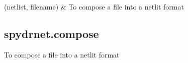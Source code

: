\documentclass[letterpaper,10pt,english,openany,oneside]{sphinxmanual}
\begin{document}
\begin{savenotes}\sphinxatlongtablestart\begin{longtable}[c]{}
\hline

\endfirsthead

%
{}\\
\hline

\endhead

\hline
{}\\
\endfoot

\endlastfoot

{\hyperref[\detokenize{reference/classes/generated/spydrnet.compose:spydrnet.compose}]{}}(netlist, filename)
&
To compose a file into a netlit format
\\
\hline
\end{longtable}\sphinxatlongtableend\end{savenotes}


\subsection{spydrnet.compose}
\label{\detokenize{reference/classes/generated/spydrnet.compose:spydrnet-compose}}\label{\detokenize{reference/classes/generated/spydrnet.compose::doc}}

\begin{fulllineitems}
\label{\detokenize{reference/classes/generated/spydrnet.compose:spydrnet.compose}}
To compose a file into a netlit format

\end{fulllineitems}
\end{document}
